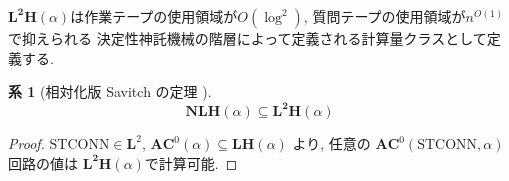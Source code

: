 \documentclass[10pt,a4paper,twocolumn]{jarticle}
\theoremstyle{definition}
\newtheorem{corollary}[theorem]{系}
\theoremstyle{remark}
\newcommand{\classfont}{\mathbf}
\newcommand{\AC}{\classfont{AC}}
\renewcommand{\L}{\classfont{L}}
\newcommand{\LH}{\classfont{LH}}
\newcommand{\NLH}{\classfont{NLH}}
\newcommand{\probfont}{\text}
\newcommand{\STCONN}{\probfont{STCONN}}
\begin{document}
$\classfont{L^2H}(\alpha)$は作業テープの使用領域が$O(\log^2)$,
質問テープの使用領域が$n^{O(1)}$で抑えられる
決定性神託機械の階層によって定義される計算量クラスとして定義する.
\begin{corollary}[相対化版 Savitch の定理
{\cite{savitch1970relationships}}]
\label{corollary:end}
\begin{equation*}
 \NLH(\alpha) \subseteq \classfont{L^2H}(\alpha)
\end{equation*}
\end{corollary}

\begin{proof}
 $\STCONN \in \L^2$, $\AC^0(\alpha) \subseteq \LH(\alpha)$ より, 
 任意の $\AC^0(\STCONN, \alpha)$ 回路の値は
 $\classfont{L^2H}(\alpha)$で計算可能.
\end{proof}


\end{document}
